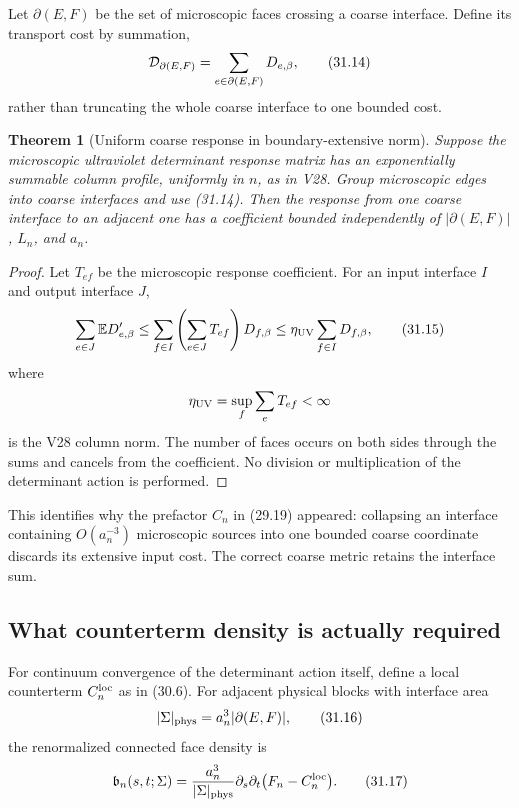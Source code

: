 \documentclass[11pt]{article}
\newtheorem{theorem}{Theorem}[section]
\theoremstyle{remark}
\begin{document}
Let \(\partial(E,F)\) be the set of microscopic faces crossing a
coarse interface.  Define its transport cost by summation,
\[
 {\cal D}_{\partial(E,F)}
 =
 \sum_{e\in\partial(E,F)}D_{e,\beta},                      \tag{31.14}
\]
rather than truncating the whole coarse interface to one bounded
cost.

\begin{theorem}[Uniform coarse response in boundary-extensive norm]
\label{thm:v15v31-boundary-metric}
Suppose the microscopic ultraviolet determinant response matrix has
an exponentially summable column profile, uniformly in \(n\), as
in V28.  Group microscopic edges into coarse interfaces and use
(31.14).  Then the response from one coarse interface to an adjacent
one has a coefficient bounded independently of
\(|\partial(E,F)|\), \(L_n\), and \(a_n\).
\end{theorem}

\begin{proof}
Let \(T_{ef}\) be the microscopic response coefficient.  For an
input interface \(I\) and output interface \(J\),
\[
 \sum_{e\in J}\mathbb ED_{e,\beta}'
 \le
 \sum_{f\in I}
 \left(\sum_{e\in J}T_{ef}\right)D_{f,\beta}
 \le
 \eta_{\rm UV}\sum_{f\in I}D_{f,\beta},                    \tag{31.15}
\]
where
\[
 \eta_{\rm UV}=\sup_f\sum_eT_{ef}<\infty
\]
is the V28 column norm.  The number of faces occurs on both sides
through the sums and cancels from the coefficient.  No division or
multiplication of the determinant action is performed.
\end{proof}

This identifies why the prefactor \(C_n\) in (29.19) appeared:
collapsing an interface containing \(O(a_n^{-3})\) microscopic
sources into one bounded coarse coordinate discards its extensive
input cost.  The correct coarse metric retains the interface sum.

\subsection{What counterterm density is actually required}

For continuum convergence of the determinant action itself, define
a local counterterm \(C_n^{\rm loc}\) as in (30.6).  For adjacent
physical blocks with interface area
\[
 |\Sigma|_{\rm phys}=a_n^3|\partial(E,F)|,                  \tag{31.16}
\]
the renormalized connected face density is
\[
 {\mathfrak b}_n(s,t;\Sigma)
 =
 \frac{a_n^3}{|\Sigma|_{\rm phys}}
 \partial_s\partial_t
 \bigl(F_n-C_n^{\rm loc}\bigr).                            \tag{31.17}
\]
\end{document}
